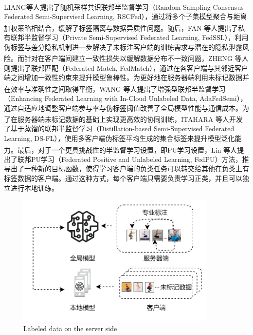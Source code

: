 LIANG等人\textsuperscript{\cite{liang2022rscfed}}提出了随机采样共识联邦半监督学习（Random Sampling Consensus Federated Semi-Supervised Learning, RSCFed），通过将多个子集模型聚合与距离加权策略相结合，缓解了标签隔离与数据异质性问题。随后，FAN 等人\textsuperscript{\cite{fan2022private}}提出了私有联邦半监督学习（Private Semi-Supervised Federated Learning, FedSSL），利用伪标签与差分隐私机制进一步解决了未标注客户端的训练需求与潜在的隐私泄露风险。而针对在客户端间建立一致性损失以缓解数据分布不一致问题，ZHENG 等人\textsuperscript{\cite{jeong2020federated}}则提出了联邦匹配（Federated Match, FedMatch），通过在各客户端与其邻近客户端之间增加一致性约束来提升模型鲁棒性。为更好地在服务器端利用未标记数据并在效率与准确性之间取得平衡，WANG 等人\textsuperscript{\cite{wang2022enhancing}}提出了增强型联邦半监督学习（Enhancing Federated Learning with In-Cloud Unlabeled Data, AdaFedSemi），通过自适应地调整客户端参与率与伪标签阈值改善了全局模型性能与通信成本。为了在服务器端未标记数据的基础上实现更高效的协同训练，ITAHARA 等人\textsuperscript{\cite{itahara2021distillation}}开发了基于蒸馏的联邦半监督学习（Distillation-based Semi-Supervised Federated Learning, DS-FL），使用多客户端伪标签平均生成的集合标签来提升模型泛化能力。最后，对于一个更具挑战性的半监督学习设置，即PU学习设置，Lin 等人\textsuperscript{\cite{FedPU}}提出了联邦PU学习（Federated Positive and Unlabeled Learning, FedPU）方法，推导出了一种新的目标函数，使得学习客户端的负类任务可以转交给其他在负类上有标签数据的客户端。通过这种方式，每个客户端只需要负责学习正类，并且可以独立进行本地训练。

\vspace{-0.1cm}
\begin{figure}[h]
	\centering
	\includegraphics[width=10cm]{chapters/imgs/LabelAtServer}
	{\wuhao Labeled data on the server side}
	\label{LabelAtServer}
\end{figure}
\vspace{-0.35cm}

